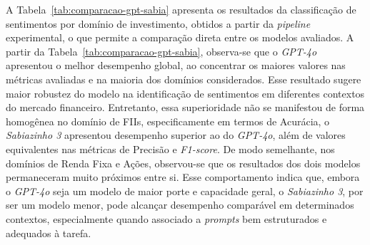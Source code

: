 \documentclass[12pt]{article}
\begin{document}
A Tabela~\ref{tab:comparacao-gpt-sabia} apresenta os resultados da classificação de sentimentos por domínio de investimento, obtidos a partir da \textit{pipeline} experimental, o que permite a comparação direta entre os modelos avaliados. %
A partir da Tabela~\ref{tab:comparacao-gpt-sabia}, observa-se que o \textit{GPT-4o} apresentou o melhor desempenho global, ao concentrar os maiores valores nas métricas avaliadas e na maioria dos domínios considerados. Esse resultado sugere maior robustez do modelo na identificação de sentimentos em diferentes contextos do mercado financeiro. Entretanto, essa superioridade não se manifestou de forma homogênea no domínio de FIIs, especificamente em termos de Acurácia, o \textit{Sabiazinho 3} apresentou desempenho superior ao do \textit{GPT-4o}, além de valores equivalentes nas métricas de Precisão e \textit{F1-score}. De modo semelhante, nos domínios de Renda Fixa e Ações, observou-se que os resultados dos dois modelos permaneceram muito próximos entre si. Esse comportamento indica que, embora o \textit{GPT-4o} seja um modelo de maior porte e capacidade geral, o \textit{Sabiazinho 3}, por ser um modelo menor, pode alcançar desempenho comparável em determinados contextos, especialmente quando associado a \textit{prompts} bem estruturados e adequados à tarefa.
\end{document}
